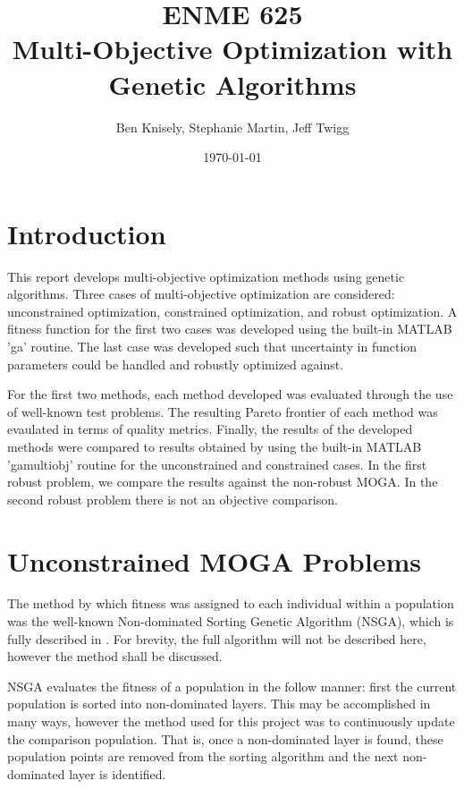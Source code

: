 \documentclass{article}
\title{ENME 625 \\
Multi-Objective Optimization with Genetic Algorithms}
\author{Ben Knisely, Stephanie Martin, Jeff Twigg}
\date{ \today }
\begin{document}
 
\maketitle

\newpage
 
\tableofcontents
 
\newpage 
 
\section{Introduction}
 
This report develops multi-objective optimization methods using genetic algorithms. Three cases of multi-objective optimization are considered: unconstrained optimization, constrained optimization, and robust optimization. A fitness function for the first two cases was developed using the built-in MATLAB 'ga' routine. The last case was developed such that uncertainty in function parameters could be handled and robustly optimized against.\newline

\noindent For the first two methods, each method developed was evaluated through the use of well-known test problems. The resulting Pareto frontier of each method was evaulated in terms of quality metrics. Finally, the results of the developed methods were compared to results obtained by using the built-in MATLAB 'gamultiobj' routine for the unconstrained and constrained cases.  In the first robust problem, we compare the results against the non-robust MOGA.  In the second robust problem there is not an objective comparison.
 

\section{Unconstrained MOGA Problems}
The method by which fitness was assigned to each individual within a population was the well-known Non-dominated Sorting Genetic Algorithm (NSGA), which is fully described in \cite{deb2001multi}. For brevity, the full algorithm will not be described here, however the method shall be discussed. \newline

\noindent NSGA evaluates the fitness of a population in the follow manner: first the current population is sorted into non-dominated layers. This may be accomplished in many ways, however the method used for this project was to continuously update the comparison population. That is, once a non-dominated layer is found, these population points are removed from the sorting algorithm and the next non-dominated layer is identified.  \newline
\end{document}
